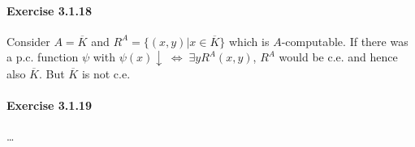 \documentclass[a4paper,11pt]{article}
\begin{document}
\paragraph{Exercise 3.1.18}

Consider $A = \overline{K}$ and $R^A = \{ (x,y) | x \in \overline{K} \}$ which is $A$-computable.
If there was a p.c. function $\psi$ with $\psi(x)\!\downarrow \; \Leftrightarrow \; \exists y R^A(x,y)$,
$R^A$ would be c.e. and hence also $\overline{K}$. But $\overline{K}$ is not c.e.


\paragraph{Exercise 3.1.19}

\ldots
\end{document}
